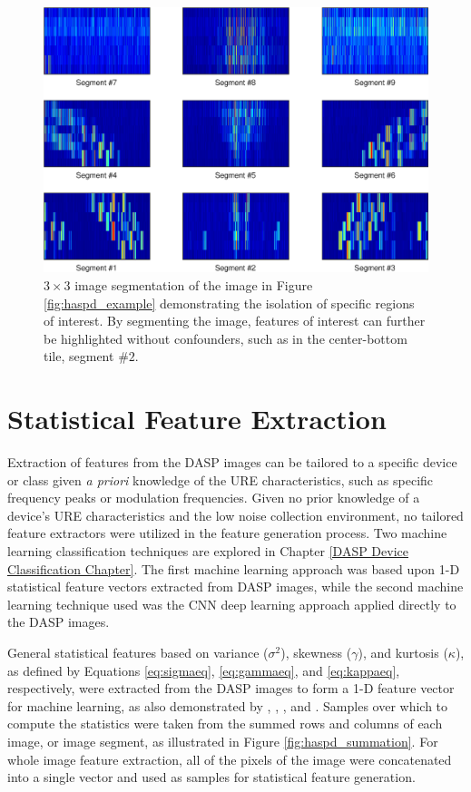 \begin{figure}[tb]
	\includegraphics[width=\textwidth]{./dasp_algorithm_results/hasp_segment_filenum_12001.eps}
	\centering
	\caption{$3 \times 3$ image segmentation of the image in Figure \ref{fig:haspd_example} demonstrating the isolation of specific regions of interest.  By segmenting the image, features of interest can further be highlighted without confounders, such as in the center-bottom tile, segment $\#2$.}
	\label{fig:haspd_segment}
\end{figure}

\section[Statistical Feature Extraction]{Statistical Feature Extraction}
\label{Statistical Feature Extraction}

Extraction of features from the DASP images can be tailored to a specific device or class given \emph{a priori} knowledge of the URE characteristics, such as specific frequency peaks or modulation frequencies.  Given no prior knowledge of a device's URE characteristics and the low noise collection environment, no tailored feature extractors were utilized in the feature generation process.  Two machine learning classification techniques are explored in Chapter \ref{DASP Device Classification Chapter}. The first machine learning approach was based upon 1-D statistical feature vectors extracted from DASP images, while the second machine learning technique used was the CNN deep learning approach applied directly to the DASP images.   

General statistical features based on variance ($\sigma^2$), skewness ($\gamma$), and kurtosis ($\kappa$), as defined by Equations \ref{eq:sigmaeq}, \ref{eq:gammaeq}, and \ref{eq:kappaeq}, respectively, were extracted from the DASP images to form a 1-D feature vector for machine learning, as also demonstrated by \cite{Zhenfei2009}, \cite{Klein2009}, \cite{Lukacs2016}, and \cite{Cobb2010}.  Samples over which to compute the statistics were taken from the summed rows and columns of each image, or image segment, as illustrated in Figure \ref{fig:haspd_summation}.  For whole image feature extraction, all of the pixels of the image were concatenated into a single vector and used as samples for statistical feature generation.  

